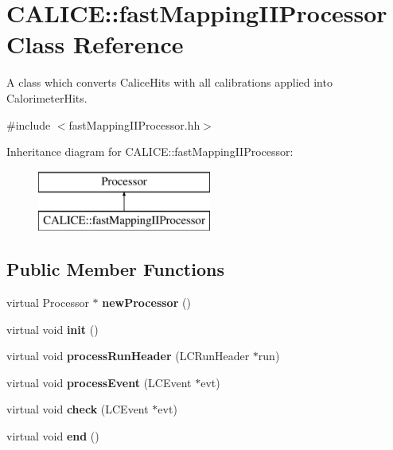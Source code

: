 \section{C\-A\-L\-I\-C\-E\-:\-:fast\-Mapping\-I\-I\-Processor Class Reference}
\label{classCALICE_1_1fastMappingIIProcessor}


A class which converts Calice\-Hits with all calibrations applied into Calorimeter\-Hits.  




{\ttfamily \#include $<$fast\-Mapping\-I\-I\-Processor.\-hh$>$}

Inheritance diagram for C\-A\-L\-I\-C\-E\-:\-:fast\-Mapping\-I\-I\-Processor\-:\begin{figure}[H]
\begin{center}
\leavevmode
\includegraphics[height=2.000000cm]{classCALICE_1_1fastMappingIIProcessor}
\end{center}
\end{figure}
\subsection*{Public Member Functions}
\begin{DoxyCompactItemize}
\item 
virtual Processor $\ast$ {\bfseries new\-Processor} ()\label{classCALICE_1_1fastMappingIIProcessor_a84d864c37b51a69f3a5bb3336d11290b}

\item 
virtual void {\bfseries init} ()\label{classCALICE_1_1fastMappingIIProcessor_ad804302fd35900a04771a1647ee9584c}

\item 
virtual void {\bfseries process\-Run\-Header} (L\-C\-Run\-Header $\ast$run)\label{classCALICE_1_1fastMappingIIProcessor_a4dcdb93e7877928387c0da90288cd243}

\item 
virtual void {\bfseries process\-Event} (L\-C\-Event $\ast$evt)\label{classCALICE_1_1fastMappingIIProcessor_ae133d2ea34fae73e13cbbb23d567eef6}

\item 
virtual void {\bfseries check} (L\-C\-Event $\ast$evt)\label{classCALICE_1_1fastMappingIIProcessor_ade7ed6e2dea19fb8b0dce38bececbab4}

\item 
virtual void {\bfseries end} ()\label{classCALICE_1_1fastMappingIIProcessor_a720b8590ee681bb8f78bca09370129b7}

\end{DoxyCompactItemize}

